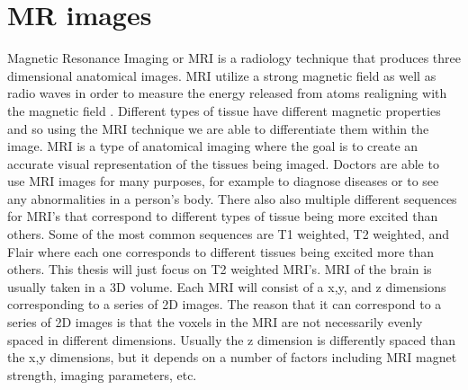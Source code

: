 \section{MR images}
        Magnetic Resonance Imaging or MRI is a radiology technique that produces three dimensional anatomical images. 
        MRI utilize a strong magnetic field as well as radio waves in order to measure the energy released from atoms realigning with the magnetic field \cite{doi:10.1002/9781118786574.ch1MRI}. 
        Different types of tissue have different magnetic properties and so using the MRI technique we are able to differentiate them within the image. 
        MRI is a type of anatomical imaging where the goal is to create an accurate visual representation of the tissues being imaged. 
        Doctors are able to use MRI images for many purposes, for example to diagnose diseases or to see any abnormalities in a person's body. 
        There also also multiple different sequences for MRI's that correspond to different types of tissue being more excited than others.
        Some of the most common sequences are T1 weighted, T2 weighted, and Flair where each one corresponds to different tissues being excited more than others. 
        This thesis will just focus on T2 weighted MRI's.
        MRI of the brain is usually taken in a 3D volume. 
        Each MRI will consist of a x,y, and z dimensions corresponding to a series of 2D images.
        The reason that it can correspond to a series of 2D images is that the voxels in the MRI are not necessarily evenly spaced in different dimensions. 
        Usually the z dimension is differently spaced than the x,y dimensions, but it depends on a number of factors including MRI magnet strength, imaging parameters, etc.
        
